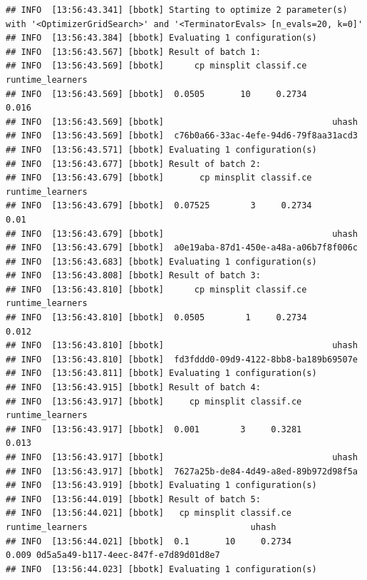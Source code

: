 \documentclass[
]{scrbook}
\newenvironment{Shaded}{\begin{snugshade}}{\end{snugshade}}
\newcommand{\FunctionTok}[1]{\textcolor[rgb]{0.00,0.00,0.00}{#1}}
\newcommand{\NormalTok}[1]{#1}
\newcommand{\SpecialCharTok}[1]{\textcolor[rgb]{0.00,0.00,0.00}{#1}}
\renewenvironment{Shaded} {\begin{snugshade}\small} {\end{snugshade}}
\begin{document}
\begin{Shaded}
\end{Shaded}

\begin{verbatim}
## INFO  [13:56:43.341] [bbotk] Starting to optimize 2 parameter(s) with '<OptimizerGridSearch>' and '<TerminatorEvals> [n_evals=20, k=0]' 
## INFO  [13:56:43.384] [bbotk] Evaluating 1 configuration(s) 
## INFO  [13:56:43.567] [bbotk] Result of batch 1: 
## INFO  [13:56:43.569] [bbotk]      cp minsplit classif.ce runtime_learners 
## INFO  [13:56:43.569] [bbotk]  0.0505       10     0.2734            0.016 
## INFO  [13:56:43.569] [bbotk]                                 uhash 
## INFO  [13:56:43.569] [bbotk]  c76b0a66-33ac-4efe-94d6-79f8aa31acd3 
## INFO  [13:56:43.571] [bbotk] Evaluating 1 configuration(s) 
## INFO  [13:56:43.677] [bbotk] Result of batch 2: 
## INFO  [13:56:43.679] [bbotk]       cp minsplit classif.ce runtime_learners 
## INFO  [13:56:43.679] [bbotk]  0.07525        3     0.2734             0.01 
## INFO  [13:56:43.679] [bbotk]                                 uhash 
## INFO  [13:56:43.679] [bbotk]  a0e19aba-87d1-450e-a48a-a06b7f8f006c 
## INFO  [13:56:43.683] [bbotk] Evaluating 1 configuration(s) 
## INFO  [13:56:43.808] [bbotk] Result of batch 3: 
## INFO  [13:56:43.810] [bbotk]      cp minsplit classif.ce runtime_learners 
## INFO  [13:56:43.810] [bbotk]  0.0505        1     0.2734            0.012 
## INFO  [13:56:43.810] [bbotk]                                 uhash 
## INFO  [13:56:43.810] [bbotk]  fd3fddd0-09d9-4122-8bb8-ba189b69507e 
## INFO  [13:56:43.811] [bbotk] Evaluating 1 configuration(s) 
## INFO  [13:56:43.915] [bbotk] Result of batch 4: 
## INFO  [13:56:43.917] [bbotk]     cp minsplit classif.ce runtime_learners 
## INFO  [13:56:43.917] [bbotk]  0.001        3     0.3281            0.013 
## INFO  [13:56:43.917] [bbotk]                                 uhash 
## INFO  [13:56:43.917] [bbotk]  7627a25b-de84-4d49-a8ed-89b972d98f5a 
## INFO  [13:56:43.919] [bbotk] Evaluating 1 configuration(s) 
## INFO  [13:56:44.019] [bbotk] Result of batch 5: 
## INFO  [13:56:44.021] [bbotk]   cp minsplit classif.ce runtime_learners                                uhash 
## INFO  [13:56:44.021] [bbotk]  0.1       10     0.2734            0.009 0d5a5a49-b117-4eec-847f-e7d89d01d8e7 
## INFO  [13:56:44.023] [bbotk] Evaluating 1 configuration(s) 

\end{verbatim}
\end{document}
